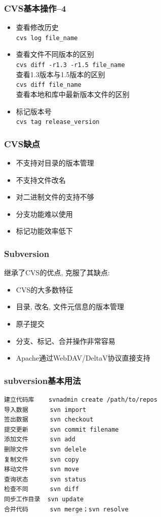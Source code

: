 \documentclass[compress]{beamer}
\begin{document}
\begin{frame}[containsverbatim]
\frametitle{CVS基本操作--4}
\begin{itemize}
\item 查看修改历史\\
\verb~cvs log file_name~
\item 查看文件不同版本的区别\\
\verb~cvs diff -r1.3 -r1.5 file_name~\\
查看1.3版本与1.5版本的区别\\
\verb~cvs diff file_name~\\
查看本地和库中最新版本文件的区别

\item 标记版本号\\
\verb~cvs tag release_version~

\end{itemize}


\end{frame}


\begin{frame}
\frametitle{CVS缺点}

\begin{itemize}
\item 不支持对目录的版本管理
\item 不支持文件改名
\item 对二进制文件的支持不够
\item 分支功能难以使用
\item 标记功能效率低下
\end{itemize}

\end{frame}

\begin{frame}
\frametitle{Subversion}
继承了CVS的优点, 克服了其缺点:
\begin{itemize}
\item CVS的大多数特征
\item 目录, 改名, 文件元信息的版本管理
\item 原子提交
\item 分支、标记、合并操作非常容易
\item Apache通过WebDAV/DeltaV协议直接支持
\end{itemize}


\end{frame}

\begin{frame}[containsverbatim]

\frametitle{subversion基本用法}

{\small
\begin{Verbatim}
建立代码库    svnadmin create /path/to/repos
导入数据      svn import
签出数据      svn checkout
提交更新      svn commit filename
添加文件      svn add
删除文件      svn delele
复制文件      svn copy
移动文件      svn move
查询状态      svn status
检查不同      svn diff
同步工作目录  svn update
合并代码      svn merge；svn resolve
\end{Verbatim}
}
\end{frame}
\end{document}
